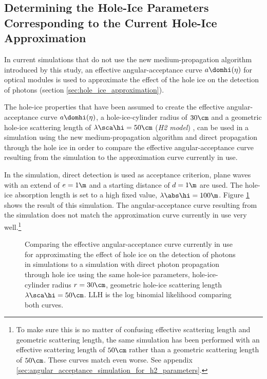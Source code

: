 
\subsection{Determining the Hole-Ice Parameters Corresponding to the Current Hole-Ice Approximation}
\label{sec:parameter_scan}

In current \clsim simulations that do not use the new medium-propagation algorithm introduced by this study, an effective angular-acceptance curve $a\domhi(\eta)$ for optical modules is used to approximate the effect of the hole ice on the detection of photons (section \ref{sec:hole_ice_approximation}).

The hole-ice properties that have been assumed to create the effective angular-acceptance curve $a\domhi(\eta)$, a hole-ice-cylinder radius of $30\cm$ and a geometric hole-ice scattering length of $\lambda\sca\hi = 50\cm$ (\textit{H2 model}) \cite{holeicestudieswithyag}, can be used in a \clsim simulation using the new medium-propagation algorithm and direct propagation through the hole ice in order to compare the effective angular-acceptance curve resulting from the simulation to the approximation curve currently in use.


In the simulation, direct detection is used as acceptance criterion, plane waves with an extend of $e=1\m$ and a starting distance of $d=1\m$ are used. The hole-ice absorption length is set to a high fixed value, $\lambda\abs\hi = 100\m$.
Figure \ref{fig:chie4Ite} shows the result of this simulation. The angular-acceptance curve resulting from the simulation does not match the approximation curve currently in use very well.\footnote{To make sure this is no matter of confusing effective scattering length and geometric scattering length, the same simulation has been performed with an effective scattering length of $50\cm$ rather than a geometric scattering length of $50\cm$. These curves match even worse. See appendix \ref{sec:angular_acceptance_simulation_for_h2_parameters}.}

\begin{figure}[htbp]
  \caption{Comparing the effective angular-acceptance curve currently in use for approximating the effect of hole ice on the detection of photons in simulations to a simulation with direct photon propagation through hole ice using the same hole-ice parameters, hole-ice-cylinder radius $r=30\cm$, geometric hole-ice scattering length $\lambda\sca\hi = 50\cm$. LLH is the log binomial likelihood comparing both curves.}
  \label{fig:chie4Ite}
\end{figure}

